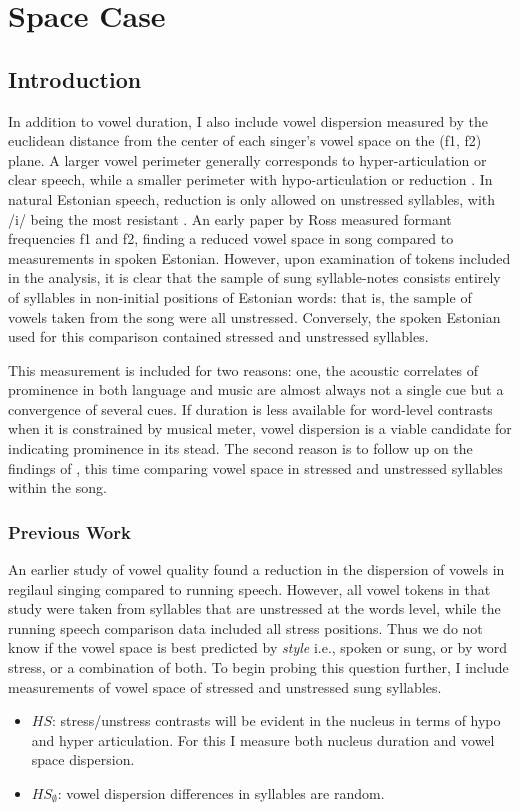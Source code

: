 \chapter{Space Case}
\section{Introduction}
  
In addition to vowel duration, I also include vowel dispersion measured by the euclidean distance from the center of each singer's vowel space on the (f1, f2) plane. A larger vowel perimeter generally corresponds to hyper-articulation or clear speech, while a smaller perimeter with hypo-articulation or reduction \cite{lindblom1990, smiljanic2005}. In natural Estonian speech, reduction is only allowed on unstressed syllables, with /i/ being the most resistant \citep{eekMeister1998}. An early paper by Ross measured formant frequencies f1 and f2, finding a reduced vowel space in song compared to measurements in spoken Estonian\cite{ross1992}. However, upon examination of tokens included in the analysis, it is clear that the sample of sung syllable-notes consists entirely of syllables in non-initial positions of Estonian words: that is, the sample of vowels taken from  the song were all unstressed. Conversely, the spoken Estonian used for this comparison contained stressed and unstressed syllables. 


This measurement is included for two reasons: one, the acoustic correlates of prominence in both language and music are almost always not a single cue but a convergence of several cues. If duration is less available for word-level contrasts when it is constrained by musical meter, vowel dispersion is a viable candidate for indicating prominence in its stead.  The second reason is to follow up on the findings of \citep{ross1989,ross1992}, this time comparing vowel space in stressed and unstressed syllables within the song.  

\subsection{Previous Work}
An earlier study of vowel quality \cite{ross1992} found a reduction in the dispersion of vowels in regilaul singing compared to running speech. However, all vowel tokens in that study were taken from syllables that are unstressed at the words level, while the running speech comparison data included all stress positions. Thus we do not know if the vowel space is best predicted by {\it style} i.e., spoken or sung, or by word stress, or a combination of both. 
To begin probing this question further, I include measurements of vowel space of stressed and unstressed sung syllables. 
	\begin{itemize}
	\item \(HS\): stress/unstress contrasts will be evident in the nucleus in terms of hypo and hyper articulation. For this I measure both nucleus duration and vowel space dispersion. 
	\item \(HS_{\emptyset}\): vowel dispersion differences in syllables are random. 
	\end{itemize}

